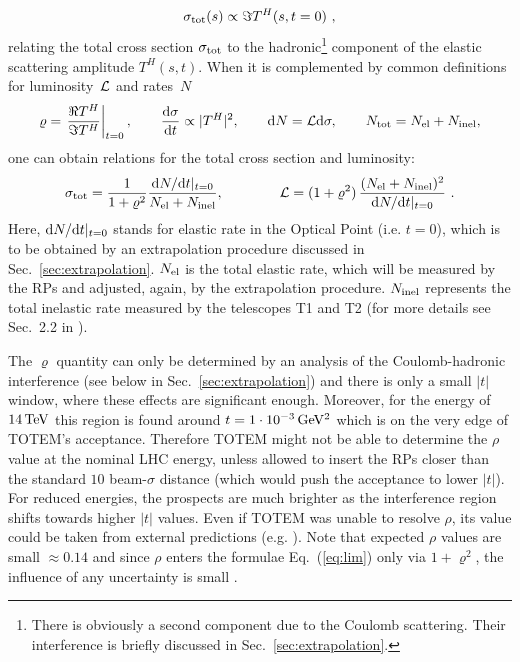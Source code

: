\documentclass{cimento}
\def\rh{\varrho}
\def\si{\sigma}
\def\un#1{\,{\rm #1}}
\def\d{{\rm d}}
\begin{document}
\begin{equation}
\si_{\rm tot}(s) \propto \Im T^H(s, t = 0) \ ,
\end{equation}
%
relating the total cross section $\si_{\rm tot}$ to the hadronic\footnote{
There is obviously a second component due to the Coulomb scattering. Their interference is briefly discussed in Sec.~\ref{sec:extrapolation}.
} component of the elastic scattering amplitude $T^H(s, t)$. When it is complemented by common definitions for luminosity~$\cal L$ and rates~$N$
%
\begin{equation}\label{eq:def}
\rh = \left. \Re T^H\over\Im T^H \right|_{t=0}, \qquad {\d\si\over\d t} \propto |T^H|^2,\qquad \d N = {\cal L} \d\si,\qquad N_{\rm tot} = N_{\rm el} + N_{\rm inel},
\end{equation}
%
one can obtain relations for the total cross section and luminosity:
%
\begin{equation}\label{eq:lim}
\si_{\rm tot} = {1\over 1+\rh^2} {{\d N/ \d t|_{t=0}}\over N_{\rm el} + N_{\rm inel}}, \qquad\qquad {\cal L} = (1+\rh^2)\, {(N_{\rm el} + N_{\rm inel})^2\over {\d N/ \d t|_{t=0}}}\ .
\end{equation}
%
Here, $\d N/\d t|_{t=0}$ stands for elastic rate in the Optical Point (i.e. $t = 0$), which is to be obtained by an extrapolation procedure discussed in Sec.~\ref{sec:extrapolation}. $N_{\rm el}$ is the total elastic rate, which will be measured by the RPs and adjusted, again, by the extrapolation procedure. $N_{\rm inel}$ represents the total inelastic rate measured by the telescopes T1 and T2 (for more details see Sec.~2.2 in \cite{mario}).

The $\rh$ quantity can only be determined by an analysis of the Coulomb-hadronic interference (see below in Sec.~\ref{sec:extrapolation}) and there is only a small $|t|$ window, where these effects are significant enough. Moreover, for the energy of $14\un{TeV}$ this region is found around $t=1\cdot10^{-3}\un{GeV^2}$ which is on the very edge of TOTEM's acceptance. Therefore TOTEM might not be able to determine the $\rho$ value at the nominal LHC energy, unless allowed to insert the RPs closer than the standard $10$ beam-$\si$ distance (which would push the acceptance to lower $|t|$). 
For reduced energies, the prospects are much brighter as the interference region shifts towards higher $|t|$ values. Even if TOTEM was unable to resolve $\rho$, its value could be taken from external predictions (e.g. \cite{cudell}). Note that expected $\rho$ values are small $\approx 0.14$ and since $\rho$ enters the formulae Eq.~(\ref{eq:lim}) only via $1+\rh^2$, the influence of any uncertainty is small \cite{jinst,mario}.
\end{document}

